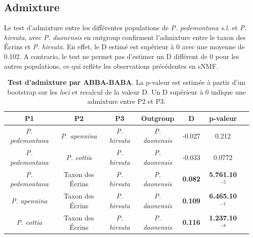\DIFaddbegin {}
\DIFaddend 

\subsection{Admixture}

Le test d'admixture entre les différentes populations de \textit{P. pedemontana s.l.} et \textit{P. hirsuta}, avec \textit{P. daonensis} en outgroup confirment l'admixture entre le taxon des Écrins et \textit{P. hirsuta}. En effet, le D estimé est supérieur à 0 avec une moyenne de 0.102. A contrario, le test ne permet pas d'estimer un D différent de 0 pour les autres populations, ce qui reflète les observations précédentes en sNMF.


\begin{table}
\begin{tabular}{ccccccc}\\\toprule  
P1 & P2 & P3 & Outgroup & D & p-valeur \\ \midrule
\textit{P. pedemontana} & \textit{P. apennina} & \textit{P. hirsuta} & \textit{P. daonensis} & -0.027 & 0.212 \\
\textit{P. pedemontana} & \textit{P. cottia} & \textit{P. hirsuta} & \textit{P. daonensis} & -0.033 & 0.0772 \\ \midrule
\textit{P. pedemontana} & Taxon des Écrins & \textit{P. hirsuta} & \textit{P. daonensis} & \textbf{0.082} & \textbf{5.761.10$^{-5}$} \\
\textit{P. apennina} & Taxon des Écrins & \textit{P. hirsuta} & \textit{P. daonensis} & \textbf{0.109} & \textbf{6.465.10$^{-7}$} \\
\textit{P. cottia} & Taxon des Écrins & \textit{P. hirsuta} & \textit{P. daonensis} & \textbf{0.116} & \textbf{1.237.10$^{-8}$} \\ \bottomrule
\end{tabular}
\caption{\textbf{Test d'admixture par ABBA-BABA}. La p-valeur est estimée à partir d'un bootstrap sur les \textit{loci} et recalcul de la valeur D. Un D supérieur à 0 indique une admixture entre P2 et P3.}
\label{ABBA}
\end{table}

